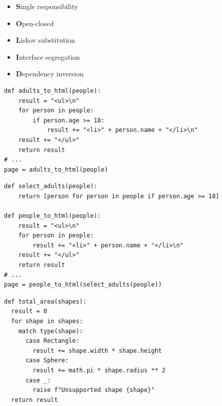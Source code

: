 \documentclass[calcdimensions,landscape,letterpaper]{powersem}
\newcommand{\thecurrentheading}{}
\newcommand{\heading}[1]{\renewcommand{\thecurrentheading}{#1}}
\begin{document}
\begin{slide}
  \heading{The SOLID Principles}
  \begin{center}
    \begin{itemize}
      \item \textbf{S}ingle responsibility
      \item \textbf{O}pen-closed
      \item \textbf{L}iskov substitution
      \item \textbf{I}nterface segregation
      \item \textbf{D}ependency inversion
    \end{itemize}
  \end{center}
\end{slide}

\begin{slide}
  \heading{Single Responsibility - Before}
  \begin{center}
    \begin{verbatim}
def adults_to_html(people):
    result = "<ul>\n"
    for person in people:
        if person.age >= 18:
            result += "<li>" + person.name + "</li>\n"
    result += "</ul>"
    return result
# ...
page = adults_to_html(people)
    \end{verbatim}
  \end{center}
\end{slide}

\begin{slide}
  \heading{Single Responsibility - After}
  \begin{center}
    \begin{verbatim}
def select_adults(people):
    return [person for person in people if person.age >= 18]

def people_to_html(people):
    result = "<ul>\n"
    for person in people:
        result += "<li>" + person.name + "</li>\n"
    result += "</ul>"
    return result
# ...
page = people_to_html(select_adults(people))
    \end{verbatim}
  \end{center}
\end{slide}

\begin{slide}
  \heading{Open-Closed - Before}
  \begin{center}
    \begin{verbatim}
def total_area(shapes):
  result = 0
  for shape in shapes:
    match type(shape):
      case Rectangle:
        result += shape.width * shape.height
      case Sphere:
        result += math.pi * shape.radius ** 2
      case _:
        raise f"Unsupported shape {shape}"
  return result
    \end{verbatim}
  \end{center}
\end{slide}
\end{document}
